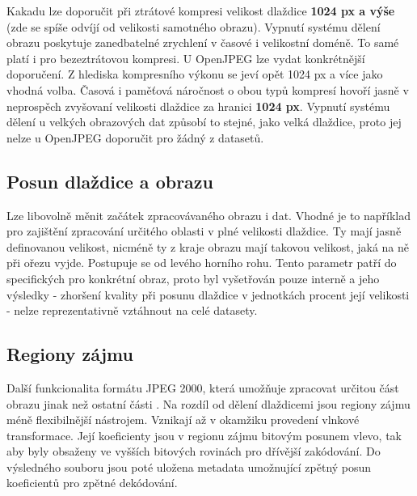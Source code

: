 Kakadu lze doporučit při ztrátové kompresi velikost dlaždice \textbf{1024 px a výše} (zde se spíše odvíjí od velikosti samotného obrazu). Vypnutí systému dělení obrazu poskytuje zanedbatelné zrychlení v časové i velikostní doméně. To samé platí i pro bezeztrátovou kompresi. U OpenJPEG lze vydat konkrétnější doporučení. Z hlediska kompresního výkonu se jeví opět 1024 px a více jako vhodná volba. Časová i paměťová náročnost o obou typů kompresí hovoří jasně v neprospěch zvyšovaní velikosti dlaždice za hranici \textbf{1024 px}. Vypnutí systému dělení u velkých obrazových dat způsobí to stejné, jako velká dlaždice, proto jej nelze u OpenJPEG doporučit pro žádný z datasetů.


\clearpage
\newpage
\subsection*{Posun dlaždice a obrazu}
Lze libovolně měnit začátek zpracovávaného obrazu i dat. Vhodné je to například pro zajištění zpracování určitého oblasti v plné velikosti dlaždice. Ty mají jasně definovanou velikost, nicméně ty z kraje obrazu mají takovou velikost, jaká na ně při ořezu vyjde. Postupuje se od levého horního rohu. Tento parametr patří do specifických pro konkrétní obraz, proto byl vyšetřován pouze interně a jeho výsledky - zhoršení kvality při posunu dlaždice v jednotkách procent její velikosti - nelze reprezentativně vztáhnout na celé datasety.

%
%
\subsection*{Regiony zájmu}
Další funkcionalita formátu JPEG 2000, která umožňuje zpracovat určitou část obrazu jinak než ostatní části \cite{roi}. Na rozdíl od dělení dlaždicemi jsou regiony zájmu méně flexibilnější nástrojem. Vznikají až v okamžiku provedení vlnkové transformace. Její koeficienty jsou v regionu zájmu  bitovým posunem vlevo, tak aby byly obsaženy ve vyšších bitových rovinách pro dřívější zakódování. Do výsledného souboru jsou poté uložena metadata umožnující zpětný posun koeficientů pro zpětné dekódování. 

